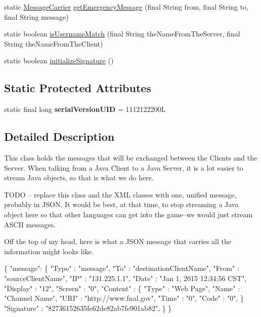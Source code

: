 \begin{DoxyCompactItemize}
\item 
static \hyperlink{classgov_1_1fnal_1_1ppd_1_1dd_1_1chat_1_1xml_1_1MessageCarrier}{Message\-Carrier} \hyperlink{classgov_1_1fnal_1_1ppd_1_1dd_1_1chat_1_1xml_1_1MessageCarrier_aa49f2c86145e9b3a9a989aa6b3f00a89}{get\-Emergency\-Message} (final String from, final String to, final String message)
\item 
static boolean \hyperlink{classgov_1_1fnal_1_1ppd_1_1dd_1_1chat_1_1xml_1_1MessageCarrier_a71211a6fa7016415fe4c10bcd08df5ed}{is\-Username\-Match} (final String the\-Name\-From\-The\-Server, final String the\-Name\-From\-The\-Client)
\item 
static boolean \hyperlink{classgov_1_1fnal_1_1ppd_1_1dd_1_1chat_1_1xml_1_1MessageCarrier_a25d278740a0516950718c40a608ac568}{initialize\-Signature} ()
\end{DoxyCompactItemize}
\subsection*{Static Protected Attributes}
\begin{DoxyCompactItemize}
\item 
\hypertarget{classgov_1_1fnal_1_1ppd_1_1dd_1_1chat_1_1xml_1_1MessageCarrier_af5a304e5d4f89a98556e1f64eca9d877}{static final long {\bfseries serial\-Version\-U\-I\-D} = 1112122200\-L}\label{classgov_1_1fnal_1_1ppd_1_1dd_1_1chat_1_1xml_1_1MessageCarrier_af5a304e5d4f89a98556e1f64eca9d877}

\end{DoxyCompactItemize}


\subsection{Detailed Description}
This class holds the messages that will be exchanged between the Clients and the Server. When talking from a Java Client to a Java Server, it is a lot easier to stream Java objects, so that is what we do here.

T\-O\-D\-O -- replace this class and the X\-M\-L classes with one, unified message, probably in J\-S\-O\-N. It would be best, at that time, to stop streaming a Java object here so that other languages can get into the game--we would just stream A\-S\-C\-I\-I messages.

Off the top of my head, here is what a J\-S\-O\-N message that carries all the information might looks like.


\begin{DoxyPre}
\{ "message": \{
    "Type"    : "message",
    "To"      : "destinationClientName",
    "From"    : "sourceClientName",
    "IP"      : "131.225.1.1",
    "Date"    : "Jan 1, 2015 12:34:56 CST",
    "Display" : "12",
    "Screen"  : "0",
    "Content" : \{
            "Type" : "Web Page",
         "Name" : "Channel Name",
         "URI"  : "http://www.fnal.gov",
         "Time" : "0",
         "Code" : "0",         
    \}
    "Signature" : "82736152635fe62de82ab7fe901ab82",
  \}
\}
\end{DoxyPre}


